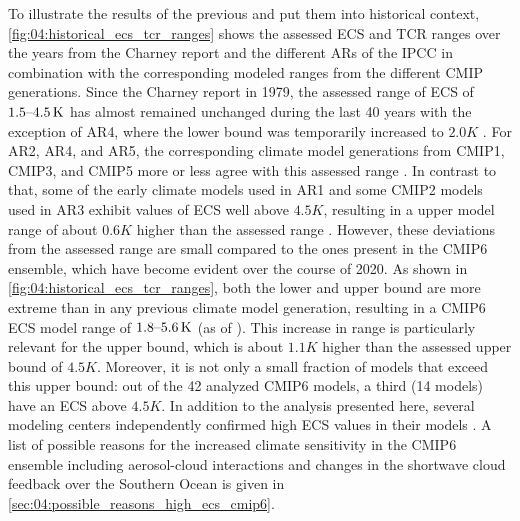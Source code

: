 To illustrate the results of the previous
 and put them into historical context,
\cref{fig:04:historical_ecs_tcr_ranges} shows the assessed \ac{ECS} and
\ac{TCR} ranges over the years from the Charney report \autocite{Charney1979}
and the different \acp{AR} of the \ac{IPCC} in combination with the
corresponding modeled ranges from the different \ac{CMIP} generations. Since
the Charney report in 1979, the assessed range of \ac{ECS} of
$\rangeunit{1.5}{4.5}{K}$ has almost remained unchanged during the last 40
years \autocite{Charney1979, Mitchell1990, Kattenberg1996, Albritton2001,
  Stocker2013} with the exception of \acs{AR}4, where the lower bound was
temporarily increased to $2.0 \unit{K}$ \autocite{Solomon2007}. For \acs{AR}2,
\acs{AR}4, and \acs{AR}5, the corresponding climate model generations from
\acs{CMIP}1, \acs{CMIP}3, and \acs{CMIP}5 more or less agree with this assessed
range \autocite{Kattenberg1996, Randall2007, Flato2013}. In contrast to that,
some of the early climate models used in \acs{AR}1 and some \acs{CMIP}2 models
used in \acs{AR}3 exhibit values of \acs{ECS} well above $4.5 \unit{K}$,
resulting in a upper model range of about $0.6 \unit{K}$ higher than the
assessed range \autocite{Mitchell1990, Cubasch2001}. However, these deviations
from the assessed range are small compared to the ones present in the
\acs{CMIP}6 ensemble, which have become evident over the course of 2020. As
shown in \cref{fig:04:historical_ecs_tcr_ranges}, both the lower and upper
bound are more extreme than in any previous climate model generation, resulting
in a \acs{CMIP}6 \ac{ECS} model range of $\rangeunit{1.8}{5.6}{K}$ (as of
\TheMonth{}). This increase in range is particularly relevant for the upper
bound, which is about $1.1 \unit{K}$ higher than the assessed upper bound of
$4.5 \unit{K}$. Moreover, it is not only a small fraction of models that exceed
this upper bound: out of the 42 analyzed \acs{CMIP}6 models, a third (14
models) have an \ac{ECS} above $4.5 \unit{K}$. In addition to the analysis
presented here, several modeling centers independently confirmed high \ac{ECS}
values in their models \autocite{Andrews2019, BodasSalcedo2019, Gettelman2019,
  Wyser2020}. A list of possible reasons for the increased climate sensitivity in
the \acs{CMIP}6 ensemble including aerosol-cloud interactions and changes in
the shortwave cloud feedback over the Southern Ocean is given in
\cref{sec:04:possible_reasons_high_ecs_cmip6}.

